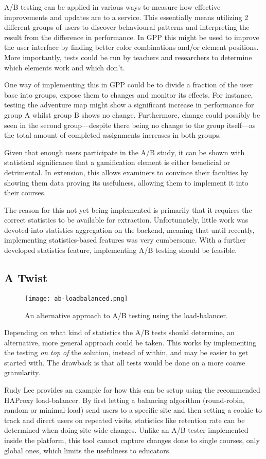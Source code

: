 A/B testing can be applied in various ways to measure how effective improvements and updates are to a service. This essentially means utilizing 2 different groups of users to discover behavioural patterns and interpreting the result from the difference in performance. In GPP this might be used to improve the user interface by finding better color combinations and/or element positions. More importantly, tests could be run by teachers and researchers to determine which elements work and which don't.

One way of implementing this in GPP could be to divide a fraction of the user base into groups, expose them to changes and monitor its effects. For instance, testing the adventure map might show a significant increase in performance for group A whilst group B shows no change. Furthermore, change could possibly be seen in the second group---despite there being no change to the group itself---as the total amount of completed assignments increases in both groups.

Given that enough users participate in the A/B study, it can be shown with statistical significance that a gamification element is either beneficial or detrimental. In extension, this allows examiners to convince their faculties by showing them data proving its usefulness, allowing them to implement it into their courses.

The reason for this not yet being implemented is primarily that it requires the correct statistics to be available for extraction. Unfortunately, little work was devoted into statistics aggregation on the backend, meaning that until recently, implementing statistics-based features was very cumbersome. With a further developed statistics feature, implementing A/B testing should be feasible.

\subsection{A Twist}
\begin{wrapfigure}[14]{r}{6cm}
    \centering
    \texttt{[image: ab-loadbalanced.png]}
    \caption{An alternative approach to A/B testing using the load-balancer.}
\end{wrapfigure}
Depending on what kind of statistics the A/B tests should determine, an alternative, more general approach could be taken. This works by implementing the testing \textit{on top of} the solution, instead of within, and may be easier to get started with. The drawback is that all tests would be done on a more coarse granularity.

Rudy Lee provides an example\cite{rudylee} for how this can be setup using the recommended HAProxy load-balancer. By first letting a balancing algorithm (round-robin, random or minimal-load) send users to a specific site and then setting a cookie to track and direct users on repeated visits, statistics like retention rate can be determined when doing site-wide changes. Unlike an A/B tester implemented inside the platform, this tool cannot capture changes done to single courses, only global ones, which limits the usefulness to educators.

